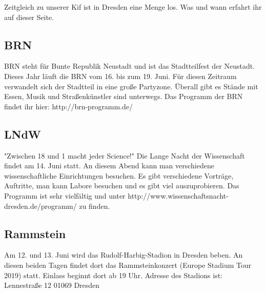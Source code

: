 Zeitgleich zu unserer Kif ist in Dresden eine Menge los. Was und wann erfahrt ihr auf dieser Seite.

\subsection*{BRN}
BRN steht für Bunte Republik Neustadt und ist das Stadtteilfest der Neustadt.
Dieses Jahr läuft die BRN vom 16. bis zum 19. Juni. Für diesen Zeitraum verwandelt sich der Stadtteil in eine große Partyzone. 
Überall gibt es Stände mit Essen, Musik und Straßenkünstler sind unterwegs.
Das Programm der BRN findet ihr hier: http://brn-programm.de/

\subsection*{LNdW}
"Zwischen 18 und 1 macht jeder Science!" 
Die Lange Nacht der Wissenschaft findet am 14. Juni statt.
An diesem Abend kann man verschiedene wissenschaftliche Einrichtungen besuchen. 
Es gibt verschiedene Vorträge, Auftritte, man kann Labore besuchen und es gibt viel auszuprobieren. 
Das Programm ist sehr vielfältig und unter http://www.wissenschaftsnacht-dresden.de/programm/ zu finden.

\subsection*{Rammstein}
Am 12. und 13. Juni wird das Rudolf-Harbig-Stadion in Dresden beben. An diesen beiden Tagen findet dort das Rammsteinkonzert (Europe Stadium Tour 2019) statt. Einlass beginnt dort ab 19 Uhr.
Adresse des Stadions ist:
Lennestraße 12
01069 Dresden
